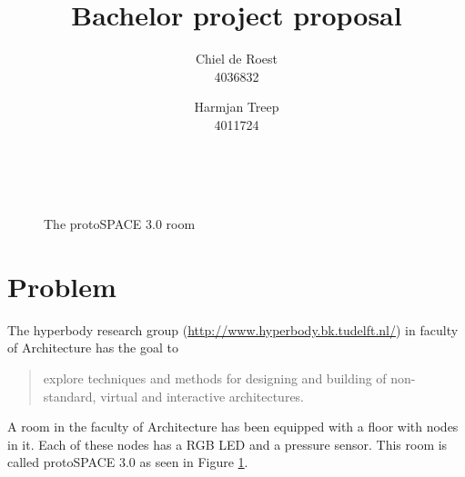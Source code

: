 \documentclass[twocolumn]{article}
\title{Bachelor project proposal}
\author{Chiel de Roest\\4036832 \and Harmjan Treep\\4011724}
\date{}
\begin{document}
\maketitle

\begin{figure}[t]
	~
	~
	\caption{The protoSPACE 3.0 room}
	\label{fig:protospace}
\end{figure}

\section*{Problem}
	The hyperbody research group (\url{http://www.hyperbody.bk.tudelft.nl/}) in faculty of Architecture has the goal to
	\begin{quote}
		explore techniques and methods for designing and building of non-standard, virtual and interactive architectures.
	\end{quote}
	A room in the faculty of Architecture has been equipped with a floor with nodes in it.
	Each of these nodes has a RGB LED and a pressure sensor.
	This room is called protoSPACE 3.0 as seen in Figure \ref{fig:protospace}.
	
\end{document}
